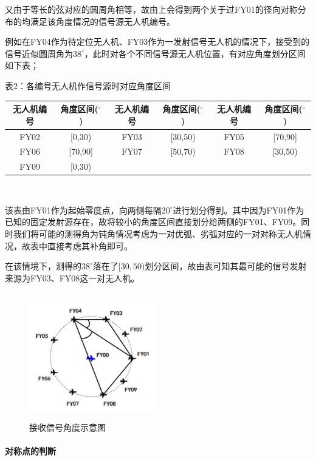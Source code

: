 \documentclass{ctexart}
\newcommand{\subsubsubsection}[1]{\paragraph{#1}\mbox{}\\}
\begin{document}
又由于等长的弦对应的圆周角相等，故由上会得到两个关于过FY01的径向对称分布的均满足该角度情况的信号源无人机编号。

例如在FY04作为待定位无人机、FY03作为一发射信号无人机的情况下，接受到的信号近似圆周角为$38^{\circ}$，此时对各个不同信号源无人机位置，有对应角度划分区间如下表；

\begin{center}
  表2：各编号无人机作信号源时对应角度区间
  ~\\
    \begin{tabular}{|c|c|c|c|c|c|}
        \hline
        无人机编号&角度区间($^{\circ}$)&无人机编号&角度区间($^{\circ}$)&无人机编号&角度区间($^{\circ}$)\\
        \hline
        FY02&[0,30)&FY03&[30,50)&FY05&[70,90]\\
        \hline
        FY06&[70,90]&FY07&[50,70)&FY08&[30,50)\\
        \hline
        FY09&[0,30)& & & &\\    
        \hline
    \end{tabular}\\
\end{center}

该表由FY01作为起始零度点，向两侧每隔$20^{\circ}$进行划分得到。其中因为FY01作为已知的固定发射源存在，故将较小的角度区间直接划分给两侧的FY01、FY09。同时我们将可能的测得角为钝角情况考虑为一对优弧、劣弧对应的一对对称无人机情况，故表中直接考虑其补角即可。

在该情境下，测得的$38^{\circ}$落在了$[30,50)$划分区间，故由表可知其最可能的信号发射来源为FY03、FY08这一对无人机。

\begin{figure}[H]
  \centering
  \includegraphics[height=5.5cm,width=5.5cm]{pic/example_for_2.a.jpg}
  \caption{接收信号角度示意图}
  \end{figure}



\subsubsubsection{对称点的判断}
\end{document}

